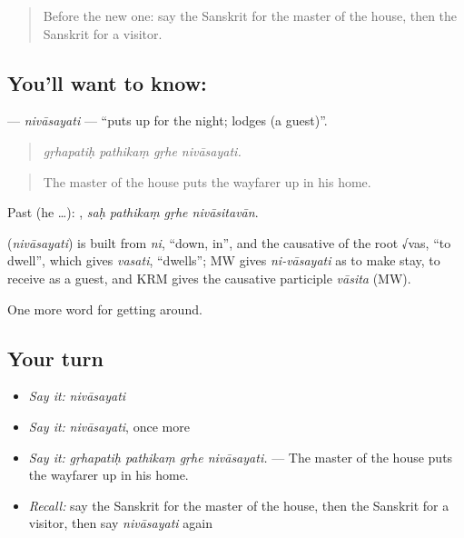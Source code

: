 \label{lesson:SA-C428-nivasayati}



\begin{quote}
Before the new one: say the Sanskrit for the master of the house, then the Sanskrit for a visitor.
\end{quote}

\subsection*{You'll want to know: }
\textbf{} — \emph{nivāsayati} — \textquotedblleft{}puts up for the night; lodges (a guest)\textquotedblright{}.

\begin{quote}
   
\end{quote}

\begin{quote}
\emph{gṛhapatiḥ pathikaṃ gṛhe nivāsayati.}
\end{quote}

\begin{quote}
The master of the house puts the wayfarer up in his home.
\end{quote}

Past (he …):    , \emph{saḥ pathikaṃ gṛhe nivāsitavān}.

\begin{cousinweb}
\textbf{} (\emph{nivāsayati}) is built from \emph{ni}, \textquotedblleft{}down, in\textquotedblright{}, and the causative of the root √vas, \textquotedblleft{}to dwell\textquotedblright{}, which gives \emph{vasati}, \textquotedblleft{}dwells\textquotedblright{}; MW gives \emph{ni-vāsayati} as to make stay, to receive as a guest, and KRM gives the causative participle \emph{vāsita} (MW).
\end{cousinweb}

\begin{grammarlens}[title={What you've built}]
One more word for getting around.
\end{grammarlens}

\subsection*{Your turn}
\begin{itemize}
\raggedright
  \item \emph{Say it:} \emph{nivāsayati}
  \item \emph{Say it:} \emph{nivāsayati}, once more
  \item \emph{Say it:} \emph{gṛhapatiḥ pathikaṃ gṛhe nivāsayati.} — The master of the house puts the wayfarer up in his home.
  \item \emph{Recall:} say the Sanskrit for the master of the house, then the Sanskrit for a visitor, then say \emph{nivāsayati} again
\end{itemize}


